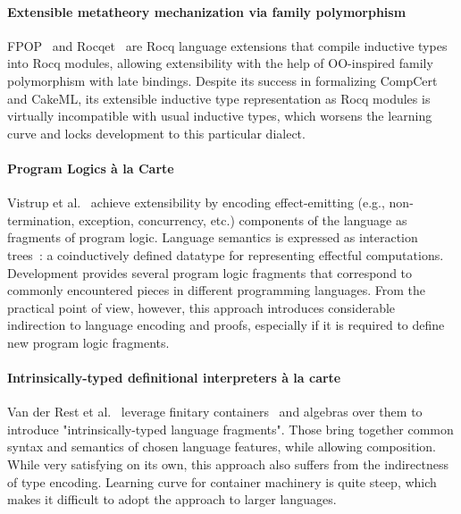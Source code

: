 \documentclass[sigplan,nonacm,review]{acmart}
\begin{document}
\paragraph{Extensible metatheory mechanization via family polymorphism} FPOP~\cite{jin2023extensible} and Rocqet~\cite{ebresafe2025certified} are Rocq language extensions that compile inductive types into Rocq modules, allowing extensibility with the help of OO-inspired family polymorphism with late bindings. 
%
%
%
%
Despite its success in formalizing CompCert and CakeML, its extensible inductive type representation as Rocq modules is virtually incompatible with usual inductive types, which worsens the learning curve and locks development to this particular dialect. 

\paragraph{Program Logics à la Carte}
Vistrup et al.~\cite{vistrup2025program} achieve extensibility by encoding effect-emitting
(e.g., non-termination, exception, concurrency, etc.)
components of the language as fragments of program logic. 
Language semantics is expressed as interaction trees~\cite{xia2019interaction}: a coinductively defined datatype for representing effectful computations. 
Development provides several program logic fragments that correspond to commonly encountered pieces in different programming languages. 
%
%
%
%
From the practical point of view, however, this approach introduces considerable indirection to language encoding and proofs, especially if it is required to define new program logic fragments.

\paragraph{Intrinsically-typed definitional interpreters {\`a} la carte}
Van der Rest et al.~\cite{van2022intrinsically} leverage finitary containers~\cite{altenkirch2015indexed} and algebras over them to introduce "intrinsically-typed language fragments".
Those bring together common syntax and semantics of chosen language features, while allowing composition. 
%
%
%
%
While very satisfying on its own, this approach also suffers from the indirectness of type encoding. Learning curve for container machinery is quite steep, which makes it difficult to adopt the approach to larger languages.
\end{document}
